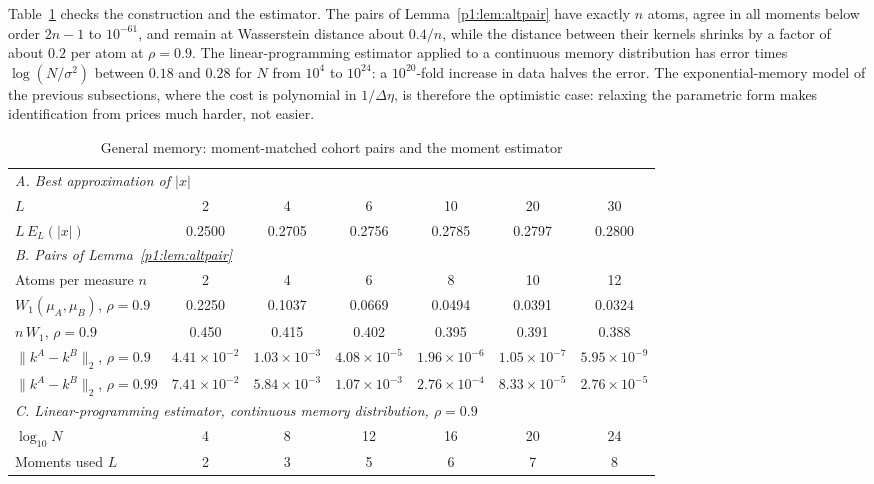 Table~\ref{p1:tab:general} checks the construction and the estimator. The pairs of Lemma~\ref{p1:lem:altpair} have exactly $n$ atoms, agree in all moments below order $2n-1$ to $10^{-61}$, and remain at Wasserstein distance about $0.4/n$, while the distance between their kernels shrinks by a factor of about $0.2$ per atom at $\rho=0.9$. The linear-programming estimator applied to a continuous memory distribution has error times $\log(N/\sigma^2)$ between $0.18$ and $0.28$ for $N$ from $10^4$ to $10^{24}$: a $10^{20}$-fold increase in data halves the error. The exponential-memory model of the previous subsections, where the cost is polynomial in $1/\Delta\eta$, is therefore the optimistic case: relaxing the parametric form makes identification from prices much harder, not easier.

\begin{table}[t]\centering\small
\begin{threeparttable}
\caption{General memory: moment-matched cohort pairs and the moment estimator}\label{p1:tab:general}
\setlength{\tabcolsep}{3.5pt}
\begin{tabular}{lcccccc}
\toprule
\multicolumn{7}{l}{\emph{A. Best approximation of $|x|$}}\\
$L$ & 2 & 4 & 6 & 10 & 20 & 30\\
$L\,E_L(|x|)$ & 0.2500 & 0.2705 & 0.2756 & 0.2785 & 0.2797 & 0.2800\\
\midrule
\multicolumn{7}{l}{\emph{B. Pairs of Lemma~\ref{p1:lem:altpair}}}\\
Atoms per measure $n$ & 2 & 4 & 6 & 8 & 10 & 12\\
$W_1(\mu_A,\mu_B)$, $\rho=0.9$ & 0.2250 & 0.1037 & 0.0669 & 0.0494 & 0.0391 & 0.0324\\
$n\,W_1$, $\rho=0.9$ & 0.450 & 0.415 & 0.402 & 0.395 & 0.391 & 0.388\\
$\|k^A-k^B\|_2$, $\rho=0.9$ & $4.41\times10^{-2}$ & $1.03\times10^{-3}$ & $4.08\times10^{-5}$ & $1.96\times10^{-6}$ & $1.05\times10^{-7}$ & $5.95\times10^{-9}$\\
$\|k^A-k^B\|_2$, $\rho=0.99$ & $7.41\times10^{-2}$ & $5.84\times10^{-3}$ & $1.07\times10^{-3}$ & $2.76\times10^{-4}$ & $8.33\times10^{-5}$ & $2.76\times10^{-5}$\\
\midrule
\multicolumn{7}{l}{\emph{C. Linear-programming estimator, continuous memory distribution, $\rho=0.9$}}\\
$\log_{10}N$ & 4 & 8 & 12 & 16 & 20 & 24\\
Moments used $L$ & 2 & 3 & 5 & 6 & 7 & 8\\

\end{tabular}
\end{threeparttable}
\end{table}
